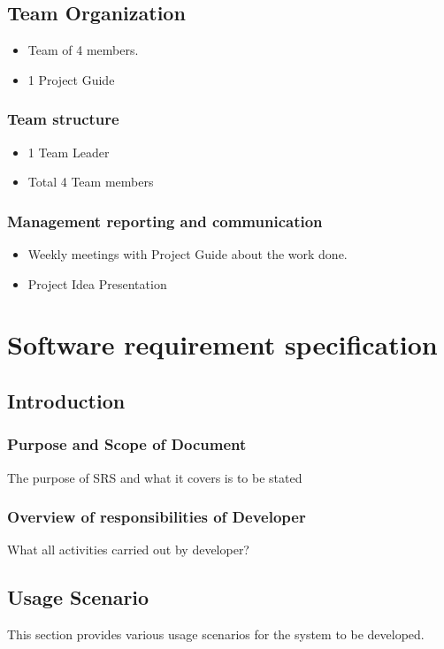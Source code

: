 \documentclass[oneside,a4paper,12pt]{report}
\begin{document}
\begin{table}[!htbp]
\section{Team Organization}
\begin{itemize}
  \item Team of 4 members.
  \item 1 Project Guide
\end{itemize}
\subsection{Team structure}
\begin{itemize}
\item 1 Team Leader
\item Total 4 Team members
\end{itemize}

\subsection{Management reporting and communication}
\begin{itemize}
\item Weekly meetings with Project Guide about the work done.
\item Project Idea Presentation
\end{itemize}

\chapter{Software requirement specification }

\section{Introduction}
\subsection{Purpose and Scope of Document}
The purpose of SRS and what it covers is to be stated

\subsection{Overview of responsibilities of Developer}
What all activities carried out by developer?

\section{Usage Scenario}
This section provides various usage scenarios for the system to be developed.

\end{table}
\end{document}
